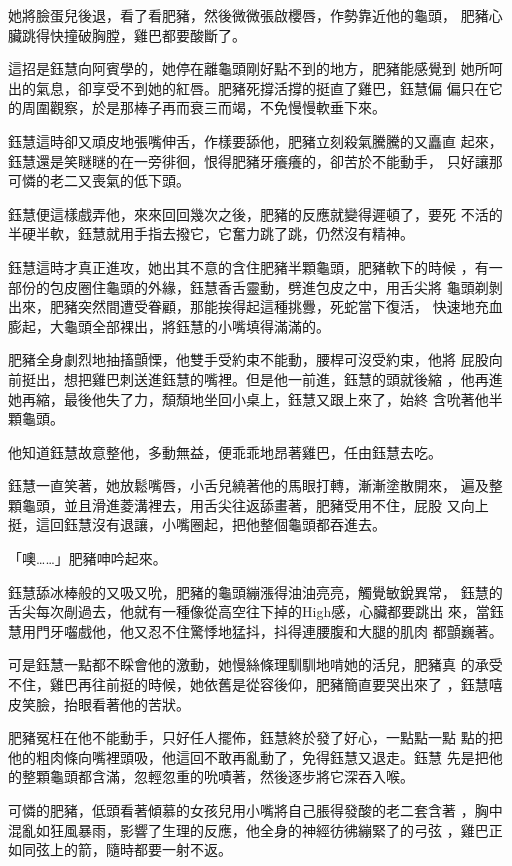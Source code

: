 她將臉蛋兒後退，看了看肥豬，然後微微張啟櫻唇，作勢靠近他的龜頭，
肥豬心臟跳得快撞破胸膛，雞巴都要酸斷了。

這招是鈺慧向阿賓學的，她停在離龜頭剛好點不到的地方，肥豬能感覺到
她所呵出的氣息，卻享受不到她的紅唇。肥豬死撐活撐的挺直了雞巴，鈺慧偏
偏只在它的周圍觀察，於是那棒子再而衰三而竭，不免慢慢軟垂下來。

鈺慧這時卻又頑皮地張嘴伸舌，作樣要舔他，肥豬立刻殺氣騰騰的又矗直
起來，鈺慧還是笑瞇瞇的在一旁徘徊，恨得肥豬牙癢癢的，卻苦於不能動手，
只好讓那可憐的老二又喪氣的低下頭。

鈺慧便這樣戲弄他，來來回回幾次之後，肥豬的反應就變得遲頓了，要死
不活的半硬半軟，鈺慧就用手指去撥它，它奮力跳了跳，仍然沒有精神。

鈺慧這時才真正進攻，她出其不意的含住肥豬半顆龜頭，肥豬軟下的時候
，有一部份的包皮圈住龜頭的外緣，鈺慧香舌靈動，劈進包皮之中，用舌尖將
龜頭剃剝出來，肥豬突然間遭受眷顧，那能挨得起這種挑釁，死蛇當下復活，
快速地充血膨起，大龜頭全部裸出，將鈺慧的小嘴填得滿滿的。

肥豬全身劇烈地抽搐顫慄，他雙手受約束不能動，腰桿可沒受約束，他將
屁股向前挺出，想把雞巴刺送進鈺慧的嘴裡。但是他一前進，鈺慧的頭就後縮
，他再進她再縮，最後他失了力，頹頹地坐回小桌上，鈺慧又跟上來了，始終
含吮著他半顆龜頭。

他知道鈺慧故意整他，多動無益，便乖乖地昂著雞巴，任由鈺慧去吃。

鈺慧一直笑著，她放鬆嘴唇，小舌兒繞著他的馬眼打轉，漸漸塗散開來，
遍及整顆龜頭，並且滑進菱溝裡去，用舌尖往返舔畫著，肥豬受用不住，屁股
又向上挺，這回鈺慧沒有退讓，小嘴圈起，把他整個龜頭都吞進去。

「噢……」肥豬呻吟起來。

鈺慧舔冰棒般的又吸又吮，肥豬的龜頭繃漲得油油亮亮，觸覺敏銳異常，
鈺慧的舌尖每次剮過去，他就有一種像從高空往下掉的High感，心臟都要跳出
來，當鈺慧用門牙囓戲他，他又忍不住驚悸地猛抖，抖得連腰腹和大腿的肌肉
都顫巍著。

可是鈺慧一點都不睬會他的激動，她慢絲條理馴馴地啃她的活兒，肥豬真
的承受不住，雞巴再往前挺的時候，她依舊是從容後仰，肥豬簡直要哭出來了
，鈺慧嘻皮笑臉，抬眼看著他的苦狀。

肥豬冤枉在他不能動手，只好任人擺佈，鈺慧終於發了好心，一點點一點
點的把他的粗肉條向嘴裡頭吸，他這回不敢再亂動了，免得鈺慧又退走。鈺慧
先是把他的整顆龜頭都含滿，忽輕忽重的吮嘖著，然後逐步將它深吞入喉。

可憐的肥豬，低頭看著傾慕的女孩兒用小嘴將自己脹得發酸的老二套含著
，胸中混亂如狂風暴雨，影響了生理的反應，他全身的神經彷彿繃緊了的弓弦
，雞巴正如同弦上的箭，隨時都要一射不返。

